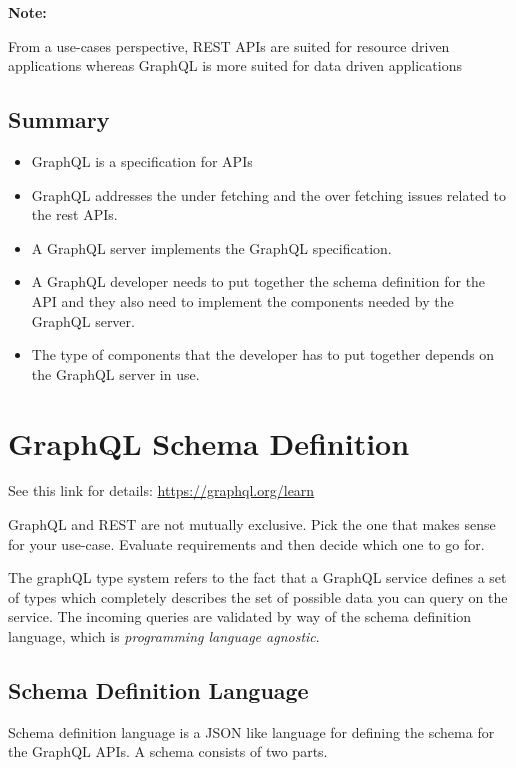 \documentclass[a4paper, 11pt]{book}
\newenvironment{note}{
    \begin{siderule}
        \textbf{Note: }
        }{
    \end{siderule}
}
\begin{document}
    \begin{note}
        From a use-cases perspective, REST APIs are suited for resource driven applications whereas GraphQL is more suited for data driven applications %
    \end{note}

    \subsection{Summary}

    \begin{itemize}
        \item GraphQL is a specification for APIs
        \item GraphQL addresses the under fetching and the over fetching issues related to the rest APIs.
        \item A GraphQL server implements the GraphQL specification.
        \item A GraphQL developer needs to put together the schema definition for the API and they also need to implement the components needed by the GraphQL server.
        \item The type of components that the developer has to put together depends on the GraphQL server in use.
    \end{itemize}


    \section{GraphQL Schema Definition}
    See this link for details: \href{https://graphql.org/learn}{https://graphql.org/learn}

    GraphQL and REST are not mutually exclusive.
    Pick the one that makes sense for your use-case.
    Evaluate requirements and then decide which one to go for.

    The graphQL type system refers to the fact that a GraphQL service defines a set of types which completely describes the set of possible data you can query on the service.
    The incoming queries are validated by way of the schema definition language, which is \textit{programming language agnostic}.

    \subsection{Schema Definition Language}
    Schema definition language is a JSON like language for defining the schema for the GraphQL APIs.
    A schema consists of two parts.
\end{document}
